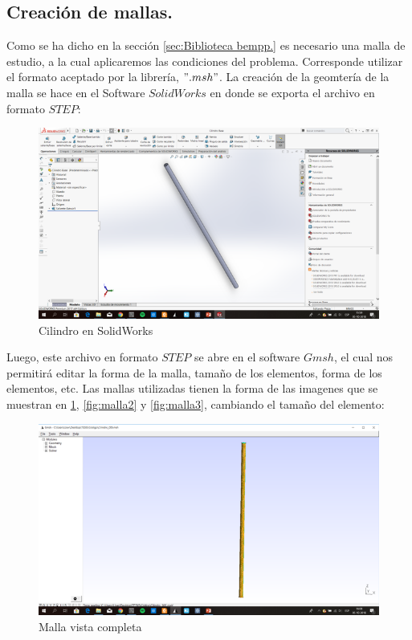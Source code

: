 \documentclass[11pt]{article}
\begin{document}
\subsection{Creación de mallas.}\label{sec:Creacion de mallas.}
Como se ha dicho en la sección \ref{sec:Biblioteca bempp.} es necesario una malla de estudio, a la cual aplicaremos las condiciones del problema. Corresponde utilizar el formato aceptado por la librería, $".msh"$. La creación de la geomtería de la malla se hace en el Software $SolidWorks$ en  donde se exporta el archivo en formato $STEP$:
\begin{figure}[H]
\centering
\includegraphics[scale=0.8]{Imagenes/Cilindro STEP.png}
\caption{Cilindro en SolidWorks}
\end{figure}
Luego, este archivo en formato $STEP$ se abre en el software $Gmsh$, el cual nos permitirá editar la forma de la malla, tamaño de los elementos, forma de los elementos, etc. Las mallas utilizadas tienen la forma de las imagenes que se muestran en \ref{fig:malla1}, \ref{fig:malla2} y \ref{fig:malla3}, cambiando el tamaño del elemento:
\begin{figure}[H]
\centering
\includegraphics[scale=0.8]{Imagenes/malla1.png}
\caption{Malla vista completa}\label{fig:malla1}
\end{figure}
\end{document}
